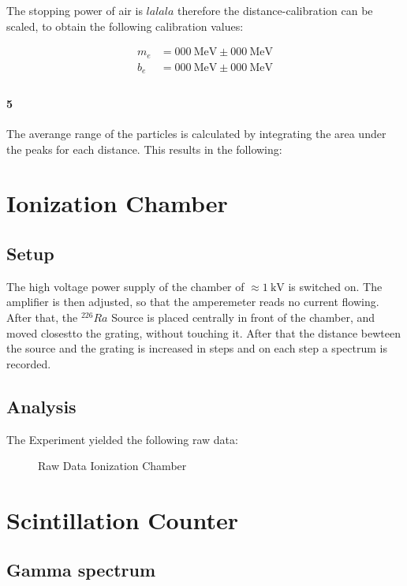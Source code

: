 \documentclass[12pt,twoside,a4paper]{scrartcl}
\begin{document}
				The stopping power of air is $lalala$ therefore the distance-calibration can be scaled, to obtain the following calibration values:

				\begin{align*}
					m_e &= \SI{000}{\mega \electronvolt} \pm \SI{000}{\mega \electronvolt} \\
					b_e &= \SI{000}{\mega \electronvolt} \pm \SI{000}{\mega \electronvolt} \\
				\end{align*}

			\paragraph{5}
				The averange range of the particles is calculated by integrating the area under the peaks for each distance.
				This results in the following:

\section{Ionization Chamber}

	\subsection{Setup}
		 The high voltage power supply of the chamber of $\approx \SI{1}{\kilo \volt}$ is switched on. The amplifier is then adjusted, so that the amperemeter reads no current flowing. After that, the $^{226}Ra$ Source is placed centrally in front of the chamber, and moved closestto the grating, without touching it. After that the distance bewteen the source and the grating is increased in steps and on each step a spectrum is recorded.

	\subsection{Analysis}

		The Experiment yielded the following raw data:

		\begin{figure}[H]
			\caption{Raw Data Ionization Chamber}
		\end{figure}


\section{Scintillation Counter}
	\subsection{Gamma spectrum}
	\label{Gamma}
\end{document}
